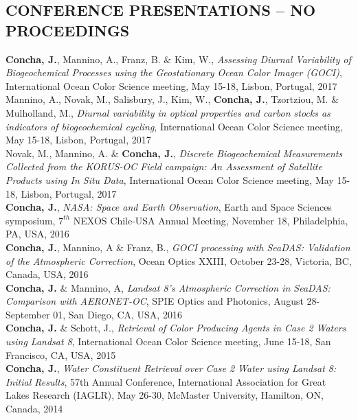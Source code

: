 \documentclass[11pt]{res} %
\begin{document}
\begin{resume}
\section{CONFERENCE PRESENTATIONS -- NO PROCEEDINGS}
\vspace{0.1in}
{\bf Concha, J.}, Mannino, A., Franz, B. $\&$ Kim, W., {\it Assessing Diurnal Variability of Biogeochemical Processes using the Geostationary Ocean Color Imager (GOCI)}, International Ocean Color Science meeting, May 15-18, Lisbon, Portugal, 2017
\vspace{0.1in}\\
Mannino, A., Novak, M., Salisbury, J., Kim, W., {\bf Concha, J.}, Tzortziou, M. $\&$ Mulholland, M., {\it Diurnal variability in optical properties and carbon stocks as indicators of biogeochemical cycling}, International Ocean Color Science meeting, May 15-18, Lisbon, Portugal, 2017
\vspace{0.1in}\\
Novak, M., Mannino, A. $\&$ {\bf Concha, J.}, {\it Discrete Biogeochemical Measurements Collected from the KORUS-OC Field campaign: An Assessment of Satellite Products using In Situ Data}, International Ocean Color Science meeting, May 15-18, Lisbon, Portugal, 2017
\vspace{0.1in}\\
{\bf Concha, J.}, {\it NASA: Space and Earth Observation}, Earth and Space Sciences symposium, $7^{th}$ NEXOS Chile-USA Annual Meeting, November 18, Philadelphia, PA, USA, 2016
\vspace{0.1in}\\
{\bf Concha, J.}, Mannino, A $\&$ Franz, B., {\it GOCI processing with SeaDAS: Validation of the Atmospheric Correction}, Ocean Optics XXIII, October 23-28, Victoria, BC, Canada, USA, 2016
\vspace{0.1in}\\
{\bf Concha, J.} $\&$ Mannino, A, {\it Landsat 8’s Atmospheric Correction in SeaDAS: Comparison with AERONET-OC}, SPIE Optics and Photonics,  August 28-September 01, San Diego, CA, USA, 2016
\vspace{-0.1in}\\
{\bf Concha, J.} $\&$ Schott, J., {\it Retrieval of Color Producing Agents in Case 2 Waters using Landsat 8}, International Ocean Color Science meeting, June 15-18, San Francisco, CA, USA, 2015
\vspace{0.1in}\\
{\bf Concha, J.}, {\it Water Constituent Retrieval over Case 2 Water using Landsat 8: Initial Results}, 57th Annual Conference, International Association for Great Lakes Research (IAGLR), May 26-30, McMaster University, Hamilton, ON, Canada, 2014

\end{resume}
\end{document}
